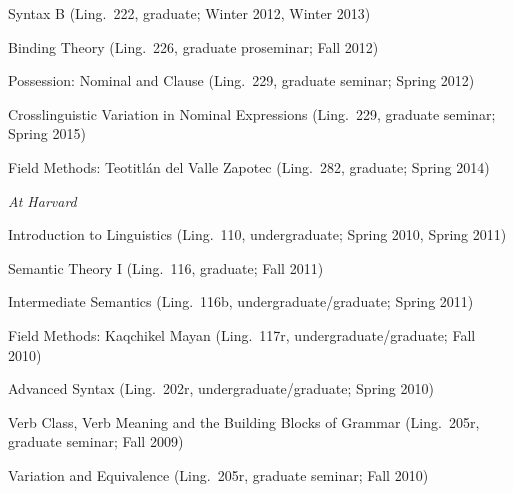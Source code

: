 \documentclass[12pt]{article}
\begin{document}
\ind Syntax B (Ling.~222, graduate; Winter 2012, Winter 2013)

\ind Binding Theory (Ling.~226, graduate proseminar; Fall 2012)

\ind Possession: Nominal and Clause (Ling.~229, graduate seminar; Spring 2012)

\ind Crosslinguistic Variation in Nominal Expressions (Ling.~229, graduate seminar; Spring 2015)

\ind Field Methods: Teotitl\'an del Valle Zapotec (Ling.~282, graduate; Spring 2014)

\medskip

\noindent\emph{At Harvard\vspace{0.05in}}

\ind Introduction to Linguistics (Ling.~110, undergraduate; Spring 2010, Spring 2011)

\ind Semantic Theory I (Ling.~116, graduate; Fall 2011)

\ind Intermediate Semantics (Ling.~116b, undergraduate/graduate; Spring 2011)

\ind Field Methods: Kaqchikel Mayan (Ling.~117r, undergraduate/graduate; Fall 2010)

\ind Advanced Syntax (Ling.~202r, undergraduate/graduate; Spring 2010)

\ind Verb Class, Verb Meaning and the Building Blocks of Grammar (Ling.~205r, graduate seminar; Fall 2009)

\ind Variation and Equivalence (Ling.~205r, graduate seminar; Fall 2010)
\end{document}
